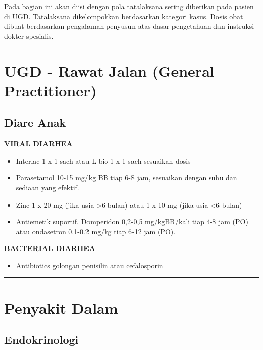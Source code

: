 \documentclass[
]{book}
\providecommand{\tightlist}{%
  \setlength{\itemsep}{0pt}\setlength{\parskip}{0pt}}
\begin{document}
Pada bagian ini akan diisi dengan pola tatalaksana sering diberikan pada pasien di UGD. Tatalaksana dikelompokkan berdasarkan kategori kasus. Dosis obat dibuat berdasarkan pengalaman penyusun atas dasar pengetahuan dan instruksi dokter spesialis.

\hypertarget{ugd---rawat-jalan-general-practitioner}{%
\section{UGD - Rawat Jalan (General Practitioner)}\label{ugd---rawat-jalan-general-practitioner}}

\hypertarget{diare-anak}{%
\subsection{Diare Anak}\label{diare-anak}}

\textbf{VIRAL DIARHEA}

\begin{itemize}
\tightlist
\item
  Interlac 1 x 1 sach atau L-bio 1 x 1 sach sesuaikan dosis
\item
  Parasetamol 10-15 mg/kg BB tiap 6-8 jam, sesuaikan dengan suhu dan sediaan yang efektif.
\item
  Zinc 1 x 20 mg (jika usia \textgreater6 bulan) atau 1 x 10 mg (jika usia \textless6 bulan)
\item
  Antiemetik suportif. Domperidon 0,2-0,5 mg/kgBB/kali tiap 4-8 jam (PO) atau ondasetron 0.1-0.2 mg/kg tiap 6-12 jam (PO).
\end{itemize}

\textbf{BACTERIAL DIARHEA}

\begin{itemize}
\tightlist
\item
  Antibiotics golongan penisilin atau cefalosporin
\end{itemize}

\begin{center}\rule{0.5\linewidth}{0.5pt}\end{center}

\hypertarget{penyakit-dalam-1}{%
\section{Penyakit Dalam}\label{penyakit-dalam-1}}

\hypertarget{endokrinologi}{%
\subsection{Endokrinologi}\label{endokrinologi}}
\end{document}
